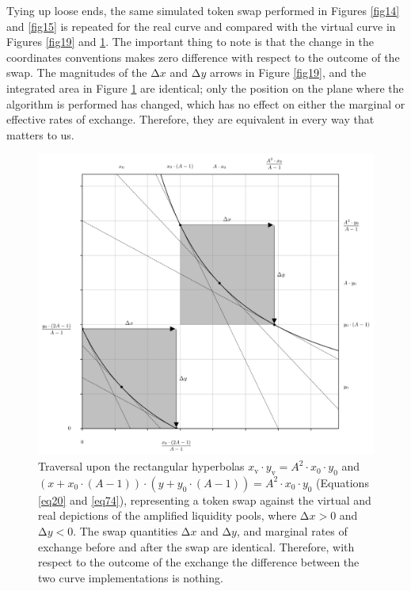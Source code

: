 \documentclass{article}
\begin{document}
Tying up loose ends, the same simulated token swap performed in Figures \ref{fig14} and \ref{fig15} is repeated for the real curve and compared with the virtual curve in Figures \ref{fig19} and \ref{fig20}. The important thing to note is that the change in the coordinates conventions makes zero difference with respect to the outcome of the swap. The magnitudes of the $\mathrm{\Delta}x$ and $\mathrm{\Delta}y$ arrows in Figure \ref{fig19}, and the integrated area in Figure \ref{fig20} are identical; only the position on the plane where the algorithm is performed has changed, which has no effect on either the marginal or effective rates of exchange. Therefore, they are equivalent in every way that matters to us. 

\begin{figure}[ht]
    \centering
    \includegraphics[width=\textwidth]{fig20.png}
    \captionsetup{
        justification=raggedright,
        singlelinecheck=false,
        font=small,
        labelfont=bf,
        labelsep=quad,
        format=plain
    }
    \caption{Traversal upon the rectangular hyperbolas $x_{\text{v}} \cdot y_{\text{v}} = A^{2} \cdot x_{0} \cdot y_{0}$ and $\left(x + x_{0} \cdot \left( A - 1 \right) \right) \cdot \left(y + y_{0} \cdot \left( A - 1 \right) \right) = A^{2} \cdot x_{0} \cdot y_{0}$ (Equations \ref{eq20} and \ref{eq74}), representing a token swap against the virtual and real depictions of the amplified liquidity pools, where $\mathrm{\Delta}x > 0$ and $\mathrm{\Delta}y < 0$. The swap quantities $\mathrm{\Delta}x$ and $\mathrm{\Delta}y$, and marginal rates of exchange before and after the swap are identical. Therefore, with respect to the outcome of the exchange the difference between the two curve implementations is nothing.}
    \label{fig20}
\end{figure}
\end{document}
